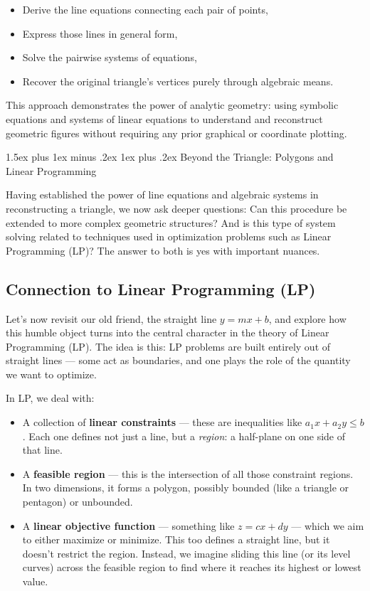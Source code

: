 \documentclass[10pt,twocolumn]{article}
\makeatletter
\renewcommand\section{%
  \@startsection{section}{1}{0pt}%
  {1.5ex plus 1ex minus .2ex}%
  {1ex plus .2ex}%
  {\normalfont\normalsize\bfseries}} %
\renewcommand\section{%
  \@startsection{section}{1}{0pt}%
  {1.5ex plus 1ex minus .2ex}%
  {1ex plus .2ex}%
  {\normalfont\Large\bfseries}} %
\makeatother
\begin{document}
\begin{itemize}
    \item Derive the line equations connecting each pair of points,
    \item Express those lines in general form,
    \item Solve the pairwise systems of equations,
    \item Recover the original triangle's vertices purely through algebraic means.
\end{itemize}

This approach demonstrates the power of analytic geometry: using symbolic equations and systems of linear equations to understand and reconstruct geometric figures without requiring any prior graphical or coordinate plotting.

\section{Beyond the Triangle: Polygons and Linear Programming}

Having established the power of line equations and algebraic systems in reconstructing a triangle, we now ask deeper questions: Can this procedure be extended to more complex geometric structures? And is this type of system solving related to techniques used in optimization problems such as Linear Programming (LP)? The answer to both is yes with important nuances.

\subsection{Connection to Linear Programming (LP)}

Let’s now revisit our old friend, the straight line \( y = mx + b \), and explore how this humble object turns into the central character in the theory of Linear Programming (LP). The idea is this: LP problems are built entirely out of straight lines — some act as boundaries, and one plays the role of the quantity we want to optimize.

\medskip

In LP, we deal with:

\begin{itemize}
    \item A collection of \textbf{linear constraints} — these are inequalities like \( a_1x + a_2y \leq b \). Each one defines not just a line, but a \textit{region}: a half-plane on one side of that line.
    
    \item A \textbf{feasible region} — this is the intersection of all those constraint regions. In two dimensions, it forms a polygon, possibly bounded (like a triangle or pentagon) or unbounded.
    
    \item A \textbf{linear objective function} — something like \( z = cx + dy \) — which we aim to either maximize or minimize. This too defines a straight line, but it doesn’t restrict the region. Instead, we imagine sliding this line (or its level curves) across the feasible region to find where it reaches its highest or lowest value.
\end{itemize}
\end{document}

